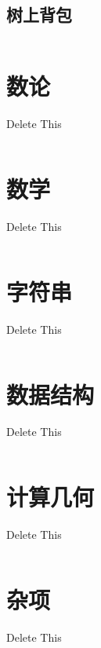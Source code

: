 \documentclass[twoside]{article}
\begin{document}
\subsection{树上背包}
\begin{lstlisting}

\end{lstlisting}
\clearpage\section{数论}
Delete This
\begin{lstlisting}
\end{lstlisting}
\clearpage\section{数学}
Delete This
\begin{lstlisting}
\end{lstlisting}
\clearpage\section{字符串}
Delete This
\begin{lstlisting}
\end{lstlisting}
\clearpage\section{数据结构}
Delete This
\begin{lstlisting}
\end{lstlisting}
\clearpage\section{计算几何}
Delete This
\begin{lstlisting}
\end{lstlisting}
\clearpage\section{杂项}
Delete This
\begin{lstlisting}
\end{lstlisting}
\end{document}
